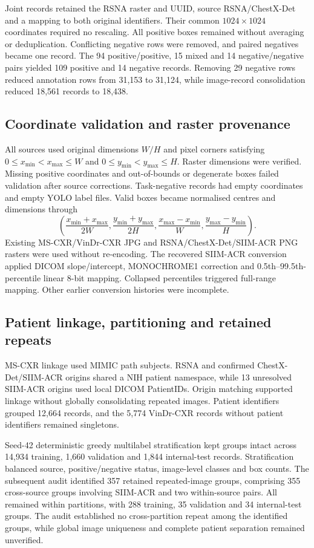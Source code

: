 Joint records retained the RSNA raster and UUID, source RSNA/ChestX-Det and a mapping to both original identifiers. Their common $1024\times1024$ coordinates required no rescaling. All positive boxes remained without averaging or deduplication. Conflicting negative rows were removed, and paired negatives became one record. The 94 positive/positive, 15 mixed and 14 negative/negative pairs yielded 109 positive and 14 negative records. Removing 29 negative rows reduced annotation rows from 31,153 to 31,124, while image-record consolidation reduced 18,561 records to 18,438.

\subsection{Coordinate validation and raster provenance}

All sources used original dimensions $W/H$ and pixel corners satisfying $0\leq x_{\min}<x_{\max}\leq W$ and $0\leq y_{\min}<y_{\max}\leq H$. Raster dimensions were verified. Missing positive coordinates and out-of-bounds or degenerate boxes failed validation after source corrections. Task-negative records had empty coordinates and empty YOLO label files. Valid boxes became normalised centres and dimensions through
\[
\left(\frac{x_{\min}+x_{\max}}{2W},\frac{y_{\min}+y_{\max}}{2H},\frac{x_{\max}-x_{\min}}{W},\frac{y_{\max}-y_{\min}}{H}\right).
\]
Existing MS-CXR/VinDr-CXR JPG and RSNA/ChestX-Det/SIIM-ACR PNG rasters were used without re-encoding. The recovered SIIM-ACR conversion applied DICOM slope/intercept, MONOCHROME1 correction and 0.5th--99.5th-percentile linear 8-bit mapping. Collapsed percentiles triggered full-range mapping. Other earlier conversion histories were incomplete.

\subsection{Patient linkage, partitioning and retained repeats}

MS-CXR linkage used MIMIC path subjects. RSNA and confirmed ChestX-Det/SIIM-ACR origins shared a NIH patient namespace, while 13 unresolved SIIM-ACR origins used local DICOM PatientIDs. Origin matching supported linkage without globally consolidating repeated images. Patient identifiers grouped 12,664 records, and the 5,774 VinDr-CXR records without patient identifiers remained singletons.

Seed-42 deterministic greedy multilabel stratification kept groups intact across 14,934 training, 1,660 validation and 1,844 internal-test records. Stratification balanced source, positive/negative status, image-level classes and box counts. The subsequent audit identified 357 retained repeated-image groups, comprising 355 cross-source groups involving SIIM-ACR and two within-source pairs. All remained within partitions, with 288 training, 35 validation and 34 internal-test groups. The audit established no cross-partition repeat among the identified groups, while global image uniqueness and complete patient separation remained unverified.


